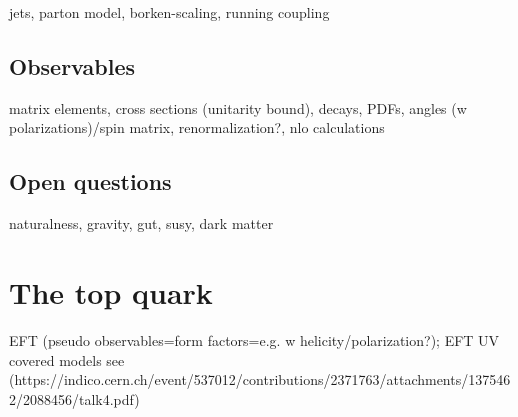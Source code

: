 jets, parton model, borken-scaling, running coupling

\subsection{Observables}
matrix elements, cross sections (unitarity bound), decays, PDFs, angles (w polarizations)/spin matrix, renormalization?, nlo calculations

\subsection{Open questions}
naturalness, gravity, gut, susy, dark matter

\section{The top quark}

EFT (pseudo observables=form factors=e.g. w helicity/polarization?); EFT UV covered models see (https://indico.cern.ch/event/537012/contributions/2371763/attachments/1375462/2088456/talk4.pdf)
\subsection{}
